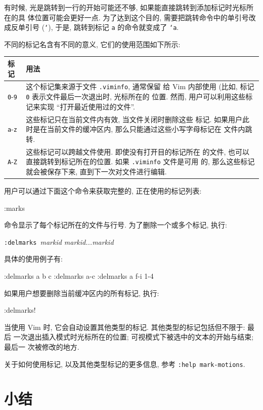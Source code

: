 \begin{vimcode}
有时候, 光是跳转到一行的开始可能还不够, 如果能直接跳转到添加标记时光标所在的具
体位置可能会更好一点. 为了达到这个目的, 需要把跳转命令中的单引号改成反单引号
(\texttt{`}), 于是, 跳转到标记 \texttt{a} 的命令就变成了 \texttt{`a}.

不同的标记名含有不同的意义, 它们的使用范围如下所示:
\begin{center}
    \begin{tabular}{lp{40em}}
    \hline
    标记        & 用法 \\
    \hline
    \texttt{0}-\texttt{9} & 这个标记集来源于文件 \texttt{.viminfo}, 通常保留
    给 Vim 内部使用 (比如, 标记 \texttt{0} 表示文件最后一次退出时, 光标所在的
    位置. 然而, 用户可以利用这些标记来实现 ``打开最近使用过的文件''. \\
    \texttt{a}-\texttt{z} & 这些标记只在当前文件内有效, 当文件关闭时删除这些
    标记. 如果用户此时是在当前文件的缓冲区内, 那么只能通过这些小写字母标记在
    文件内跳转. \\
    \texttt{A}-\texttt{Z} & 这些标记可以跨越文件使用. 即使没有打开目的标记所在
    的文件, 也可以直接跳转到标记所在的位置. 如果 \texttt{.viminfo} 文件是可用
    的, 那么这些标记就会被保存下来, 直到下一次对文件进行编辑. \\
    \hline
\end{tabular}
\end{center}

用户可以通过下面这个命令来获取完整的, 正在使用的标记列表:
\begin{vimcode}
:marks
\end{vimcode}
命令显示了每个标记所在的文件与行号. 为了删除一个或多个标记, 执行:
\begin{vimcmdform}
\texttt{:delmarks}\ \textit{markid markid...markid}
\end{vimcmdform}
具体的使用例子有:
\begin{vimcode}
:delmarks a b c
:delmarks a-c
:delmarks a f-i 1-4
\end{vimcode}
如果用户想要删除当前缓冲区内的所有标记, 执行:
\begin{vimcode}
:delmarks!
\end{vimcode}

当使用 Vim 时, 它会自动设置其他类型的标记. 其他类型的标记包括但不限于: 最后
一次退出插入模式时光标所在的位置; 可视模式下被选中的文本的开始与结束; 最后一
次被修改的地方.

关于如何使用标记, 以及其他类型标记的更多信息, 参考 \texttt{:help mark-motions}.

\section{小结}
\label{sec:better_navigation_summary}


\end{vimcode}
